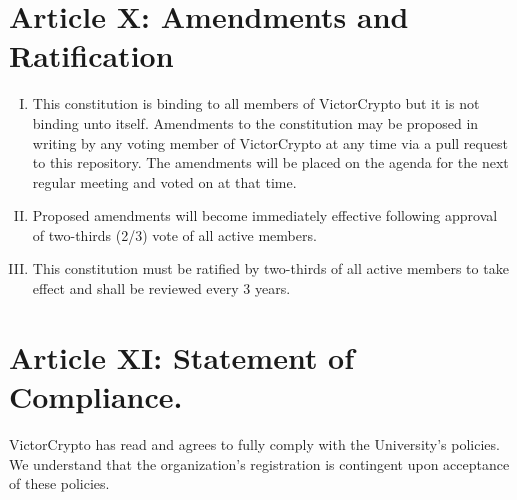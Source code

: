 \documentclass[11pt]{article}
\begin{document}
    \section{Article X: Amendments and Ratification}
    \begin{enumerate}[I.]
        \item This constitution is binding to all members of VictorCrypto but it is not binding unto itself.
        Amendments to the constitution may be proposed in writing by any voting member of VictorCrypto at any time via a pull request to this repository.
        The amendments will be placed on the agenda for the next regular meeting and voted on at that time.
        \item Proposed amendments will become immediately effective following approval of two-thirds (2/3) vote of all active members.
        \item This constitution must be ratified by two-thirds of all active members to take effect and shall be reviewed every 3 years.
    \end{enumerate}


    \section{Article XI: Statement of Compliance.}
    VictorCrypto has read and agrees to fully comply with the University's policies.
    We understand that the organization's registration is contingent upon acceptance of these policies.
\end{document}

